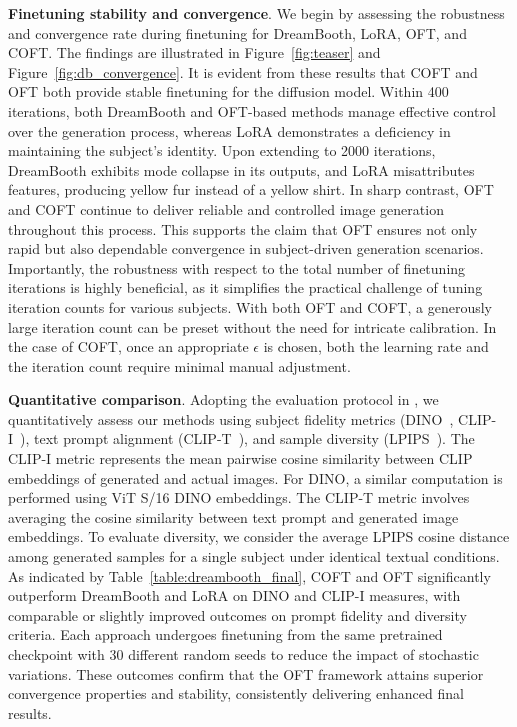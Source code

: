 \textbf{Finetuning stability and convergence}. We begin by assessing the robustness and convergence rate during finetuning for DreamBooth, LoRA, OFT, and COFT. The findings are illustrated in Figure~\ref{fig:teaser} and Figure~\ref{fig:db_convergence}. It is evident from these results that COFT and OFT both provide stable finetuning for the diffusion model. Within 400 iterations, both DreamBooth and OFT-based methods manage effective control over the generation process, whereas LoRA demonstrates a deficiency in maintaining the subject’s identity. Upon extending to 2000 iterations, DreamBooth exhibits mode collapse in its outputs, and LoRA misattributes features, producing yellow fur instead of a yellow shirt. In sharp contrast, OFT and COFT continue to deliver reliable and controlled image generation throughout this process. This supports the claim that OFT ensures not only rapid but also dependable convergence in subject-driven generation scenarios. Importantly, the robustness with respect to the total number of finetuning iterations is highly beneficial, as it simplifies the practical challenge of tuning iteration counts for various subjects. With both OFT and COFT, a generously large iteration count can be preset without the need for intricate calibration. In the case of COFT, once an appropriate $\epsilon$ is chosen, both the learning rate and the iteration count require minimal manual adjustment.

\textbf{Quantitative comparison}. Adopting the evaluation protocol in \cite{ruiz2023dreambooth}, we quantitatively assess our methods using subject fidelity metrics (DINO~\cite{caron2021emerging}, CLIP-I~\cite{radford2021learning}), text prompt alignment (CLIP-T~\cite{radford2021learning}), and sample diversity (LPIPS~\cite{zhang2018unreasonable}). The CLIP-I metric represents the mean pairwise cosine similarity between CLIP embeddings of generated and actual images. For DINO, a similar computation is performed using ViT S/16 DINO embeddings. The CLIP-T metric involves averaging the cosine similarity between text prompt and generated image embeddings. To evaluate diversity, we consider the average LPIPS cosine distance among generated samples for a single subject under identical textual conditions. As indicated by Table~\ref{table:dreambooth_final}, COFT and OFT significantly outperform DreamBooth and LoRA on DINO and CLIP-I measures, with comparable or slightly improved outcomes on prompt fidelity and diversity criteria. Each approach undergoes finetuning from the same pretrained checkpoint with 30 different random seeds to reduce the impact of stochastic variations. These outcomes confirm that the OFT framework attains superior convergence properties and stability, consistently delivering enhanced final results.

